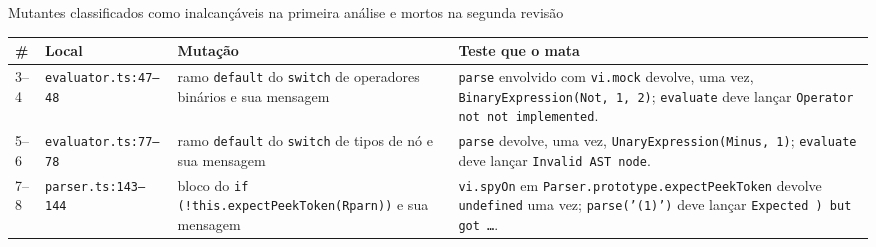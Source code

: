 \begin{quadro}[htb]
    \centering
    \ABNTEXfontereduzida
    \begin{minipage}{\textwidth}
        \caption{Mutantes classificados como inalcançáveis na primeira análise e mortos na segunda revisão}
        \label{qua:revisao2}
        \centering
        \begin{tabular}{p{0.7cm}p{3.0cm}p{4.2cm}p{6.9cm}}
            \toprule
            \textbf{\#} & \textbf{Local} & \textbf{Mutação} & \textbf{Teste que o mata} \\
            \midrule
            3--4 & \texttt{evaluator.ts:47--48} & ramo \texttt{default} do \texttt{switch} de operadores binários e sua mensagem & \texttt{parse} envolvido com \texttt{vi.mock} devolve, uma vez, \texttt{BinaryExpression(Not, 1, 2)}; \texttt{evaluate} deve lançar \texttt{Operator not not implemented}. \\
            5--6 & \texttt{evaluator.ts:77--78} & ramo \texttt{default} do \texttt{switch} de tipos de nó e sua mensagem & \texttt{parse} devolve, uma vez, \texttt{UnaryExpression(Minus, 1)}; \texttt{evaluate} deve lançar \texttt{Invalid AST node}. \\
            7--8 & \texttt{parser.ts:143--144} & bloco do \texttt{if (!this.expectPeekToken(Rparn))} e sua mensagem & \texttt{vi.spyOn} em \texttt{Parser.prototype.expectPeekToken} devolve \texttt{undefined} uma vez; \texttt{parse('(1)')} deve lançar \texttt{Expected ) but got \ldots}. \\
            \bottomrule
        \end{tabular}
    \end{minipage}
\end{quadro}

